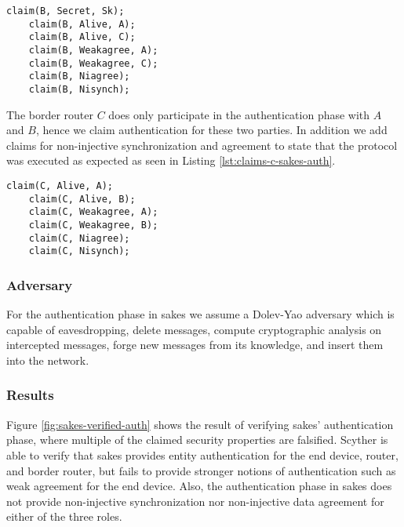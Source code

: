 \begin{lstlisting}[caption={Security claims for role B during the authentication phase in SAKES.}, label={lst:claims-b-sakes-auth}]
	claim(B, Secret, Sk);
	claim(B, Alive, A);
	claim(B, Alive, C);
	claim(B, Weakagree, A);
	claim(B, Weakagree, C);
	claim(B, Niagree);
	claim(B, Nisynch);
\end{lstlisting}

The border router $C$ does only participate in the authentication phase with $A$ and $B$, hence we claim authentication for these two parties. In addition we add claims for non-injective synchronization and agreement to state that the protocol was executed as expected as seen in Listing \ref{lst:claims-c-sakes-auth}.\\

\begin{lstlisting}[caption={Security claims for role C during key establishment in SAKES.}, label={lst:claims-c-sakes-auth}]
	claim(C, Alive, A);
	claim(C, Alive, B);
	claim(C, Weakagree, A);
	claim(C, Weakagree, B);
	claim(C, Niagree);
	claim(C, Nisynch);
\end{lstlisting}

\subsubsection{Adversary}

For the authentication phase in \gls{sakes} we assume a Dolev-Yao adversary which is capable of eavesdropping, delete messages, compute cryptographic analysis on intercepted messages, forge new messages from its knowledge, and insert them into the network. 

\subsubsection{Results}

Figure \ref{fig:sakes-verified-auth} shows the result of verifying \gls{sakes}' authentication phase, where multiple of the claimed security properties are falsified. Scyther is able to verify that \gls{sakes} provides entity authentication for the end device, router, and border router, but fails to provide stronger notions of authentication such as weak agreement for the end device. Also, the authentication phase in \gls{sakes} does not provide non-injective synchronization nor non-injective data agreement for either of the three roles.

